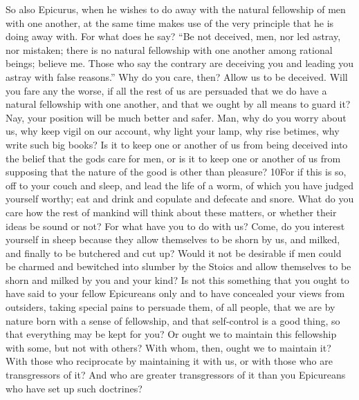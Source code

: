 So also Epicurus, when he wishes to do away with the natural fellowship of men with one another, at the same time makes use of the very principle that he is doing away with. For what does he say? ``Be not deceived, men, nor led astray, nor mistaken; there is no natural fellowship with one another among rational beings; believe me. Those who say the contrary are deceiving you and leading you astray with false reasons.'' Why do you care, then? Allow us to be deceived. Will you fare any the worse, if all the rest of us are persuaded that we do have a natural fellowship with one another, and that we ought by all means to guard it? Nay, your position will be much better and safer. Man, why do you worry about us, why keep vigil on our account, why light your lamp, why rise betimes, why write such big books? Is it to keep one or another of us from being deceived into the belief that the gods care for men, or is it to keep one or another of us from supposing that the nature of the good is other than pleasure? 10For if this is so, off to your couch and sleep, and lead the life of a worm, of which you have judged yourself worthy; eat and drink and copulate and defecate and snore. What do you care how the rest of mankind will think about these matters, or whether their ideas be sound or not? For what have you to do with us? Come, do you interest yourself in sheep because they allow themselves to be shorn by us, and milked, and finally to be butchered and cut up? Would it not be desirable if men could be charmed and bewitched into slumber by the Stoics and allow themselves to be shorn and milked by you and your kind? Is not this something that you ought to have said to your fellow Epicureans only and to have concealed your views from outsiders, taking special pains to persuade them, of all people, that we are by nature born with a sense of fellowship, and that self-control is a good thing, so that everything may be kept for you? Or ought we to maintain this fellowship with some, but not with others? With whom, then, ought we to maintain it? With those who reciprocate by maintaining it with us, or with those who are transgressors of it? And who are greater transgressors of it than you Epicureans who have set up such doctrines?

